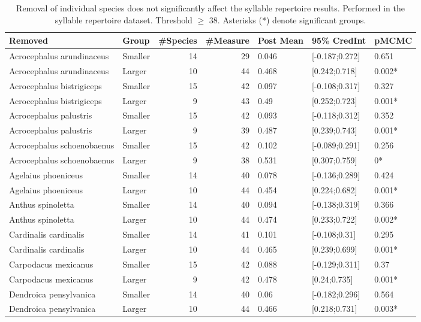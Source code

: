 \documentclass{article}
\begin{document}
  \begin{table}[H]
  \centering
  \caption{Removal of individual species does not significantly affect the syllable repertoire
  results. Performed in the syllable repertoire dataset. Threshold $\ge$ 38. Asterisks (*) denote significant groups.}
  \begin{tabular}{llrrlll}
  \hline
  Removed & Group & \#Species & \#Measure & Post Mean & 95\% CredInt & pMCMC \\ 
  \hline
  Acrocephalus arundinaceus & Smaller & 14 & 29 & 0.046 & [-0.187;0.272] & 0.651 \\ 
  Acrocephalus arundinaceus & Larger & 10 & 44 & 0.468 & [0.242;0.718] & 0.002* \\ 
  Acrocephalus bistrigiceps & Smaller & 15 & 42 & 0.097 & [-0.108;0.317] & 0.327 \\ 
  Acrocephalus bistrigiceps & Larger & 9 & 43 & 0.49 & [0.252;0.723] & 0.001* \\ 
  Acrocephalus palustris & Smaller & 15 & 42 & 0.093 & [-0.118;0.312] & 0.352 \\ 
  Acrocephalus palustris & Larger & 9 & 39 & 0.487 & [0.239;0.743] & 0.001* \\ 
  Acrocephalus schoenobaenus & Smaller & 15 & 42 & 0.102 & [-0.089;0.291] & 0.256 \\ 
  Acrocephalus schoenobaenus & Larger & 9 & 38 & 0.531 & [0.307;0.759] & 0* \\ 
  Agelaius phoeniceus & Smaller & 14 & 40 & 0.078 & [-0.136;0.289] & 0.424 \\ 
  Agelaius phoeniceus & Larger & 10 & 44 & 0.454 & [0.224;0.682] & 0.001* \\ 
  Anthus spinoletta & Smaller & 14 & 40 & 0.094 & [-0.138;0.319] & 0.366 \\ 
  Anthus spinoletta & Larger & 10 & 44 & 0.474 & [0.233;0.722] & 0.002* \\ 
  Cardinalis cardinalis & Smaller & 14 & 41 & 0.101 & [-0.108;0.31] & 0.295 \\ 
  Cardinalis cardinalis & Larger & 10 & 44 & 0.465 & [0.239;0.699] & 0.001* \\ 
  Carpodacus mexicanus & Smaller & 15 & 42 & 0.088 & [-0.129;0.311] & 0.37 \\ 
  Carpodacus mexicanus & Larger & 9 & 42 & 0.478 & [0.24;0.735] & 0.001* \\ 
  Dendroica pensylvanica & Smaller & 14 & 40 & 0.06 & [-0.182;0.296] & 0.564 \\ 
  Dendroica pensylvanica & Larger & 10 & 44 & 0.466 & [0.218;0.731] & 0.003* \\ 

\end{tabular}
\end{table}
\end{document}
